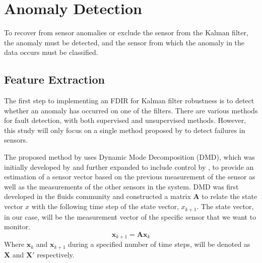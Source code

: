\documentclass[letterpaper, 10 pt, conference]{ieeeconf}  %
\begin{document}

\section{Anomaly Detection}
To recover from sensor anomalies or exclude the sensor from the Kalman filter, the anomaly must be detected, and the sensor from which the anomaly in the data occurs must be classified.

\subsection{Feature Extraction}
The first step to implementing an FDIR for Kalman filter robustness is to detect whether an anomaly has occurred on one of the filters. There are various methods for fault detection, with both supervised and unsupervised methods. However, this study will only focus on a single method proposed by \textcite{DeSilva2020} to detect failures in sensors.

The proposed method by \textcite{DeSilva2020} uses Dynamic Mode Decomposition (DMD), which was initially developed by \textcite{schmid2011applications} and further expanded to include control by \textcite{proctor2016dynamic}, to provide an estimation of a sensor vector based on the previous measurement of the sensor as well as the measurements of the other sensors in the system. DMD was first developed in the fluids community and constructed a matrix $\mathbf{A}$ to relate the state vector $x$ with the following time step of the state vector, $x_{k+1}$. The state vector, in our case, will be the measurement vector of the specific sensor that we want to monitor.
\begin{equation}
\mathbf{x}_{k+1} = \mathbf{Ax}_k
\end{equation}
Where $\mathbf{x}_k$ and $\mathbf{x}_{k+1}$ during a specified number of time steps, will be denoted as $\mathbf{X}$ and $\mathbf{X'}$ respectively.
\end{document}
